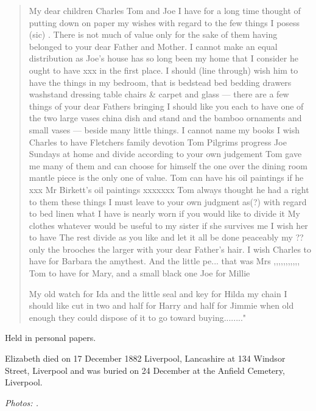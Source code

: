 \begin{quotation}
My dear children Charles Tom and Joe I have for a long time thought of putting down on paper my wishes with regard to the few things I posess (sic) . There is not much of value only for the sake of them having belonged to your dear Father and Mother. I cannot make an equal distribution as Joe’s house has so long been my home that I consider he ought to have xxx in the first place. I should (line through) wish him to have the things in my bedroom, that is bedstead bed bedding drawers washstand dressing table chairs \& carpet and glass --- there are a few things of your dear Fathers bringing I should like you each to have one of the two large vases china dish and stand and the bamboo ornaments and small vases --- beside many little things. I cannot name my books I wish Charles to have Fletchers family devotion Tom Pilgrims progress Joe Sundays at home and divide according to your own judgement Tom gave me many of them and can choose for himself the one over the dining room mantle piece is the only one of value. Tom can have his oil paintings if he xxx Mr Birkett’s oil paintings xxxxxxx Tom always thought he had a right to them these things I must leave to your own judgment as(?) with regard to bed linen what I have is nearly worn if you would like to divide it My clothes whatever would be useful to my sister if she survives me I wish her to have The rest divide as you like and let it all be done peaceably my ?? only the brooches the larger with your dear Father’s hair. I wish Charles to have for Barbara the amythest. And the little pe... that was Mrs ,,,,,,,,,,, Tom to have for Mary, and a small black one Joe for Millie

My old watch for Ida and the little seal and key for Hilda my chain I should like cut in two and half for Harry and half for Jimmie when old enough they could dispose of it to go toward buying........"
\end{quotation}

Held in personal papers.

Elizabeth died on 17 December 1882 Liverpool, Lancashire at 134 Windsor Street, Liverpool and was buried on 24 December at the Anfield Cemetery, Liverpool. \cite{EHazelwoodDeath}

\emph{Photos: .}
